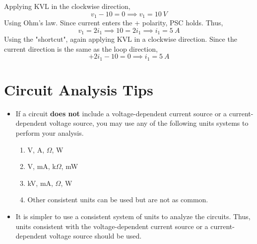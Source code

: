 \documentclass{article}
\begin{document}
\begin{sol}[1]
    Applying KVL in the clockwise direction,
    \begin{equation}
        v_1-10=0\implies v_1=\SI{10}{V}
    \end{equation}
    Using Ohm's law. Since current enters the + polarity, PSC holds. Thus,
    \begin{equation}
        v_1=2i_1\implies 10=2i_1\implies i_1=\SI{5}{A}
    \end{equation}
    Using the "shortcut", again applying KVL in a clockwise direction. Since the current direction is the same as the loop direction,
    \begin{equation}
        +2i_1-10=0\implies i_1=\SI{5}{A}
    \end{equation}
\end{sol}
\section{Circuit Analysis Tips}
\begin{itemize}
    \item If a circuit \textbf{does not} include a voltage-dependent current source or a current-dependent voltage source, you may use any of the following units systems to perform your analysis. 
    \begin{enumerate}
        \item V, A, $\Omega$, W
        \item V, mA, k$\Omega$, mW
        \item kV, mA, $\Omega$, W
        \item Other consistent units can be used but are not as common.
    \end{enumerate}
    \item It is simpler to use a consistent system of units to analyze the circuits. Thus, units consistent with the voltage-dependent current source or a current-dependent voltage source should be used.
\end{itemize}
\end{document}

